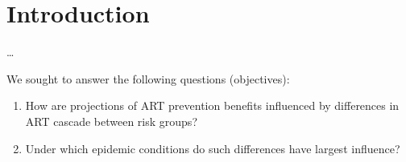 \section{Introduction}\label{intro}
\dots
\par
We sought to answer the following questions (objectives):
\begin{enumerate}
  \item\label{obj:1} How are projections of ART prevention benefits influenced by
    differences in ART cascade between risk groups?
  \item\label{obj:2} Under which epidemic conditions do such differences have largest influence?
\end{enumerate}

